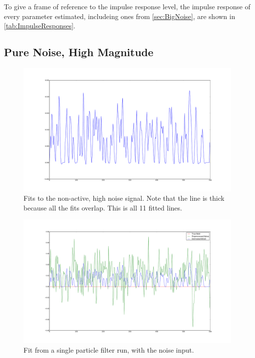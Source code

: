 To give a frame of reference to the impulse response level, the impulse response of every
parameter estimated, includeing ones from \autoref{sec:BigNoise}, are shown in \autoref{tab:ImpulseResponses}.


\subsection{Pure Noise, High Magnitude}
\label{sec:PureNoiseHighMag}

\begin{figure}[H]
\includegraphics[clip=true,trim=6cm 3cm 6cm 3cm,width=16cm]{images/fits_noiseonly_high}
\caption{Fits to the non-active, high noise signal. Note that the line is thick because all
the fits overlap. This is all 11 fitted lines.}
\label{fig:fits_noiseonly_high}
\end{figure}

\begin{figure}[H]
\includegraphics[clip=true,trim=6cm 3cm 6cm 3cm,width=16cm]{images/justbignoise_fit_0}
\caption{Fit from a single particle filter run, with the noise input. }
\label{fig:justbignoise_fit_0}
\end{figure} %

